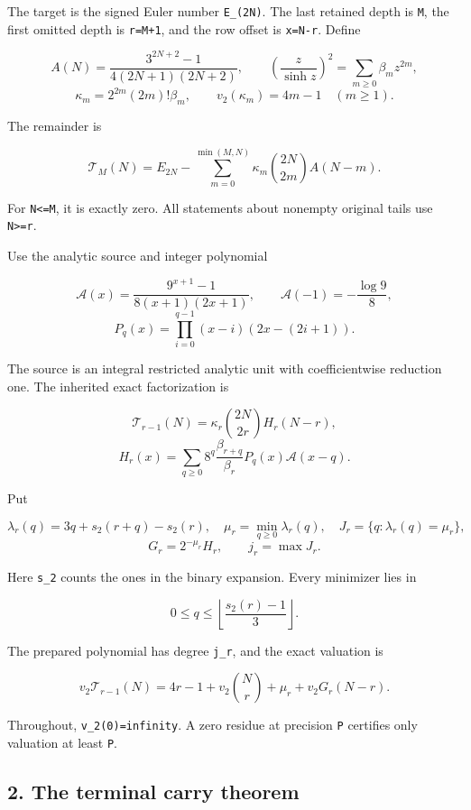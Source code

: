 \documentclass[11pt,letterpaper]{article}
\begin{document}
The target is the signed Euler number \texttt{E\_(2N)}. The last retained depth is \texttt{M}, the first omitted depth is \texttt{r=M+1}, and the row offset is \texttt{x=N-r}. Define

\[
A(N)=\frac{3^{2N+2}-1}{4(2N+1)(2N+2)},\qquad
\left(\frac z{\sinh z}\right)^2=\sum_{m\ge0}\beta_mz^{2m},
\] \[
\kappa_m=2^{2m}(2m)!\beta_m,\qquad
v_2(\kappa_m)=4m-1\quad(m\ge1).
\]

The remainder is

\[
\mathcal T_M(N)=E_{2N}-\sum_{m=0}^{\min(M,N)}
\kappa_m\binom{2N}{2m}A(N-m).
\]

For \texttt{N\textless{}=M}, it is exactly zero. All statements about nonempty original tails use \texttt{N\textgreater{}=r}.

Use the analytic source and integer polynomial

\[
\mathscr A(x)=\frac{9^{x+1}-1}{8(x+1)(2x+1)},\qquad
\mathscr A(-1)=-\frac{\log9}{8},
\] \[
P_q(x)=\prod_{i=0}^{q-1}(x-i)(2x-(2i+1)).
\]

The source is an integral restricted analytic unit with coefficientwise reduction one. The inherited exact factorization is

\[
\mathcal T_{r-1}(N)=\kappa_r\binom{2N}{2r}H_r(N-r),
\] \[
H_r(x)=\sum_{q\ge0}8^q\frac{\beta_{r+q}}{\beta_r}P_q(x)\mathscr A(x-q).
\]

Put

\[
\lambda_r(q)=3q+s_2(r+q)-s_2(r),
\quad \mu_r=\min_{q\ge0}\lambda_r(q),
\quad J_r=\{q:\lambda_r(q)=\mu_r\},
\] \[
G_r=2^{-\mu_r}H_r,\qquad j_r=\max J_r.
\]

Here \texttt{s\_2} counts the ones in the binary expansion. Every minimizer lies in

\[
0\le q\le\left\lfloor\frac{s_2(r)-1}{3}\right\rfloor.
\]

The prepared polynomial has degree \texttt{j\_r}, and the exact valuation is

\[
\boxed{
 v_2\mathcal T_{r-1}(N)
 =4r-1+v_2\binom Nr+\mu_r+v_2G_r(N-r).
} \tag{VI.3}
\]

Throughout, \texttt{v\_2(0)=infinity}. A zero residue at precision \texttt{P} certifies only valuation at least \texttt{P}.

\subsection{2. The terminal carry theorem}\label{the-terminal-carry-theorem}

\end{document}
